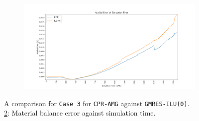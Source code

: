 \begin{figure}
\centering
\begin{subfigure}[b]{\textwidth}
   \includegraphics[width=1\linewidth]{figures/case3/matbalerr_time.pdf}
   \caption{}
   \label{case3_matbalerr}
\end{subfigure}

\caption[caption]{A comparison for \texttt{Case 3} for \texttt{CPR-AMG} against \texttt{GMRES-ILU(0)}.\\\hspace{\textwidth}
	\cref{case3_matbalerr}: Material balance error against simulation time. \\\hspace{\textwidth}}
\end{figure}

\clearpage

